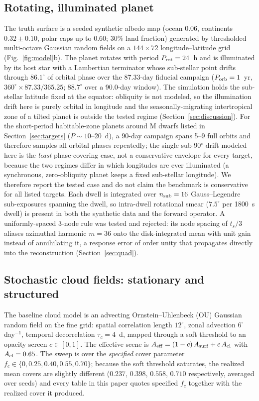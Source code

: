 \documentclass[twocolumn,10pt]{article}
\begin{document}
\subsection{Rotating, illuminated planet}
The truth surface is a seeded synthetic albedo map (ocean 0.06,
continents $0.32\pm0.10$, polar caps up to 0.60; 30\% land fraction)
generated by thresholded multi-octave Gaussian random fields on a
$144\times72$ longitude--latitude grid (Fig.~\ref{fig:model}b). The planet
rotates with period $P_{\rm rot}=24$~h and is illuminated by its host star
with a Lambertian terminator whose sub-stellar point drifts through
$86.1^\circ$ of orbital phase over the 87.33-day fiducial campaign
($P_{\rm orb}=1$~yr, $360^\circ\times87.33/365.25$; $88.7^\circ$ over a
90.0-day window).
The simulation holds the sub-stellar latitude fixed at the equator:
obliquity is not modeled, so the illumination drift here is purely orbital in
longitude and the seasonally-migrating intertropical zone of a tilted planet is
outside the tested regime (Section~\ref{sec:discussion}).
For the short-period habitable-zone planets around M dwarfs listed in
Section~\ref{sec:targets} ($P\sim10$--20~d), a 90-day campaign spans 5--9 full
orbits and therefore samples all orbital phases repeatedly; the single
sub-90$^\circ$ drift modeled here is the \emph{least} phase-covering case, not
a conservative envelope for every target, because the two regimes differ in
which longitudes are ever illuminated (a synchronous, zero-obliquity planet
keeps a fixed sub-stellar longitude). We therefore report the tested case and
do not claim the benchmark is conservative for all listed targets.
Each dwell is integrated over $n_{\rm sub}=16$ Gauss--Legendre
sub-exposures spanning the dwell, so intra-dwell rotational smear
($7.5^\circ$ per 1800~s dwell) is present in both the synthetic data and the
forward operator. A uniformly-spaced 3-node rule was tested and rejected: its
node spacing of $t_s/3$ aliases azimuthal harmonic $m=36$ onto the disk-integrated
mean with unit gain instead of annihilating it, a response error of order unity
that propagates directly into the reconstruction (Section~\ref{sec:quad}).

\subsection{Stochastic cloud fields: stationary and structured}
The baseline cloud model is an advecting Ornstein--Uhlenbeck (OU) Gaussian
random field on the fine grid: spatial correlation length $12^\circ$,
zonal advection $6^\circ$\,day$^{-1}$, temporal decorrelation $\tau_c=4$~d,
mapped through a soft threshold to an opacity screen $c\in[0,1]$. The
effective scene is $A_{\rm eff}=(1-c)\,A_{\rm surf}+c\,A_{\rm cl}$ with
$A_{\rm cl}=0.65$. The sweep is over the \emph{specified} cover parameter
$f_c\in\{0,0.25,0.40,0.55,0.70\}$; because the soft threshold saturates, the
realized mean covers are slightly different ($0.237$, $0.398$, $0.558$, $0.710$
respectively, averaged over seeds) and every table in this paper quotes
specified $f_c$ together with the realized cover it produced.
\end{document}
